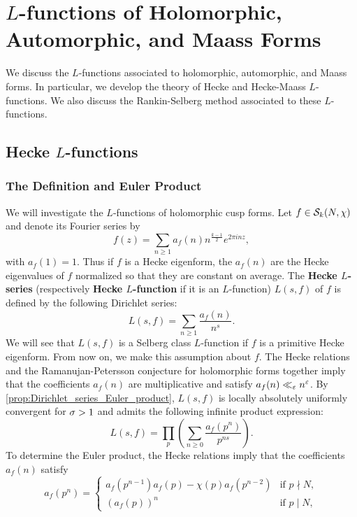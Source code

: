 \chapter{\texorpdfstring{$L$}{L}-functions of Holomorphic, Automorphic, and Maass Forms}
  We discuss the $L$-functions associated to holomorphic, automorphic, and Maass forms. In particular, we develop the theory of Hecke and Hecke-Maass $L$-functions. We also discuss the Rankin-Selberg method associated to these $L$-functions.
  \section{Hecke \texorpdfstring{$L$}{L}-functions}
    \subsection*{The Definition and Euler Product}
      We will investigate the $L$-functions of holomorphic cusp forms. Let $f \in \mathcal{S}_{k}(N,\chi)$ and denote its Fourier series by
      \[
        f(z) = \sum_{n \ge 1}a_{f}(n)n^{\frac{k-1}{2}}e^{2\pi inz},
      \]
      with $a_{f}(1) = 1$. Thus if $f$ is a Hecke eigenform, the $a_{f}(n)$ are the Hecke eigenvalues of $f$ normalized so that they are constant on average. The \textbf{Hecke $L$-series} (respectively \textbf{Hecke $L$-function} if it is an $L$-function) $L(s,f)$ of $f$ is defined by the following Dirichlet series:
      \[
        L(s,f) = \sum_{n \ge 1}\frac{a_{f}(n)}{n^{s}}.
      \]
      We will see that $L(s,f)$ is a Selberg class $L$-function if $f$ is a primitive Hecke eigenform. From now on, we make this assumption about $f$. The Hecke relations and the Ramanujan-Petersson conjecture for holomorphic forms together imply that the coefficients $a_{f}(n)$ are multiplicative and satisfy $a_{f}(n) \ll_{\varepsilon} n^{\varepsilon}$. By \cref{prop:Dirichlet_series_Euler_product}, $L(s,f)$ is locally absolutely uniformly convergent for $\sigma > 1$ and admits the following infinite product expression:
      \[
        L(s,f) = \prod_{p}\left(\sum_{n \ge 0}\frac{a_{f}(p^{n})}{p^{ns}}\right).
      \]
      To determine the Euler product, the Hecke relations imply that the coefficients $a_{f}(n)$ satisfy
      \begin{equation}\label{equ:primitive_Hecke_eigenform_recurrence_for_coefficients_of_holomorphic_L-function}
        a_{f}(p^{n}) = \begin{cases} a_{f}(p^{n-1})a_{f}(p)-\chi(p)a_{f}(p^{n-2}) & \text{if $p \nmid N$}, \\ (a_{f}(p))^{n} & \text{if $p \mid N$}, \end{cases}
      \end{equation}
